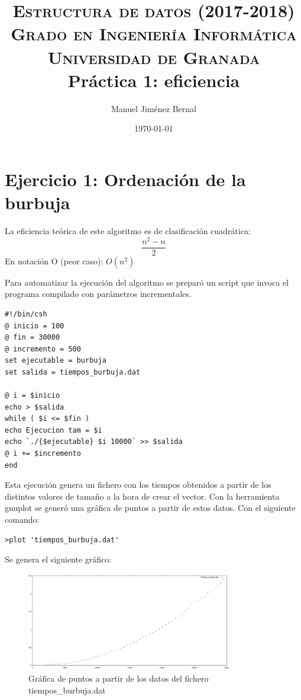 \documentclass[paper=a4, fontsize=10pt]{scrartcl} %
\title{	
\normalfont \normalsize 
\textsc{{ Estructura de datos (2017-2018)} \\ Grado en Ingeniería Informática \\ Universidad de Granada} \\ [25pt] %
\huge Práctica 1: eficiencia  \\ %
}
\author{Manuel Jiménez Bernal}
\date{\normalsize\today} %
\begin{document}
\maketitle %

\section{Ejercicio 1: Ordenación de la burbuja}

La eficiencia teórica de este algoritmo es de clasificación cuadrática: \[ \dfrac{ n^2 - n}{2} \]
En notación O (peor caso): $O(n^2)$ %

Para automatizar la ejecución del algoritmo se preparó un script que invoca el programa compilado con parámetros incrementales.

\begin{lstlisting}
#!/bin/csh
@ inicio = 100
@ fin = 30000
@ incremento = 500
set ejecutable = burbuja
set salida = tiempos_burbuja.dat

@ i = $inicio
echo > $salida
while ( $i <= $fin )
echo Ejecucion tam = $i
echo `./{$ejecutable} $i 10000` >> $salida
@ i += $incremento
end
\end{lstlisting}

Esta ejecución genera un fichero con los tiempos obtenidos a partir de los distintos valores de tamaño a la hora de crear el vector. Con la herramienta gnuplot se generó una gráfica de puntos a partir de estos datos. Con el siguiente comando:

\begin{lstlisting}
>plot 'tiempos_burbuja.dat'
\end{lstlisting}

Se genera el siguiente gráfico:

\begin{figure}[H] %
	\centering
	\label{lsblk}
	\includegraphics[width=0.8\textwidth]{../imgs/c1.PNG}
	\caption{Gráfica de puntos a partir de los datos del fichero tiempos\_burbuja.dat} 
\end{figure}
\end{document}
